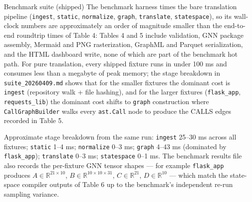 \documentclass[
  ignorenonframetext,
]{beamer}
\newcounter{none} %
\begin{document}
\begin{frame}[fragile]{Benchmark suite (shipped)}
The benchmark harness times the bare translation pipeline
(\texttt{ingest}, \texttt{static}, \texttt{normalize}, \texttt{graph},
\texttt{translate}, \texttt{statespace}), so its wall-clock numbers are
approximately an order of magnitude smaller than the end-to-end
roundtrip times of Table 4: Tables 4 and 5 include validation, GNN
package assembly, Mermaid and PNG rasterization, GraphML and Parquet
serialization, and the HTML dashboard write, none of which are part of
the benchmark hot path. For pure translation, every shipped fixture runs
in under 100 ms and consumes less than a megabyte of peak memory; the
stage breakdown in \texttt{suite\_20260409.md} shows that for the
smaller fixtures the dominant cost is \texttt{ingest} (repository walk +
file hashing), and for the larger fixtures (\texttt{flask\_app},
\texttt{requests\_lib}) the dominant cost shifts to \texttt{graph}
construction where \texttt{CallGraphBuilder} walks every
\texttt{ast.Call} node to produce the CALLS edges recorded in Table 5.

Approximate stage breakdown from the same run: \texttt{ingest} 25--30 ms
across all fixtures; \texttt{static} 1--4 ms; \texttt{normalize} 0--3
ms; \texttt{graph} 4--43 ms (dominated by \texttt{flask\_app});
\texttt{translate} 0--3 ms; \texttt{statespace} 0--1 ms. The benchmark
results file also records the per-fixture GNN tensor shapes --- for
example \texttt{flask\_app} produces
\(A \in \mathbb{R}^{21 \times 10}\),
\(B \in \mathbb{R}^{10 \times 10 \times 31}\),
\(C \in \mathbb{R}^{21}\), \(D \in \mathbb{R}^{10}\) --- which match the
state-space compiler outputs of Table 6 up to the benchmark's
independent re-run sampling variance.
\end{frame}
\end{document}
